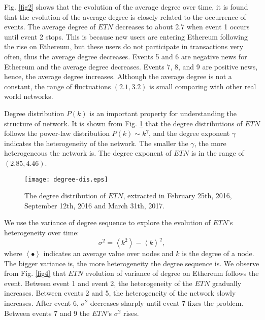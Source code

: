 \documentclass[conference]{IEEEtran}
\begin{document}
\begin{CJK*}{UTF8}{gbsn}
Fig. \ref{fig2} shows that the evolution of the average degree over time, it is found that the evolution of the average degree is closely related to the occurrence of events.
The average degree of $ETN$ decreases to about 2.7 when event 1 occurs until event 2 stops. This is because new users are entering Ethereum following the rise on Ethereum, but these users do not participate in transactions very often, thus the average degree decreases. Events 5 and 6 are negative news for Ethereum and the average degree decreases. Events 7, 8, and 9 are positive news, hence, the average degree increases. Although the average degree is not a constant, the range of fluctuations $(2.1,3.2)$ is small comparing with other real world networks.


Degree distribution $P(k)$ is an important property for understanding the structure of network\cite{barabasi2003scale}\cite{albert1999diameter}\cite{barabasi1999emergence}. It is shown from Fig. \ref{fig3} that the degree distributions of $ETN$ follows the power-law distribution $P(k)\sim k^\gamma$, and the degree exponent $\gamma$ indicates the heterogeneity of the network. The smaller the $\gamma$, the more heterogeneous the network is. The degree exponent of $ETN$ is in the range of $(2.85,4.46)$.


\begin{figure}[htbp]
\centering
\texttt{[image: degree-dis.eps]}
\caption{The degree distribution of $ETN$, extracted in February 25th, 2016, September 12th, 2016 and March 31th, 2017.}
\label{fig3}
\end{figure}

We use the variance of degree sequence to explore the evolution of $ETN$'s heterogeneity over time:
\begin{equation}
 \sigma^2=\left\langle k^2 \right\rangle-\left\langle k \right\rangle^2,
\end{equation}
where $ \left\langle \bullet \right\rangle $ indicates an average value over nodes and $k$ is the degree of a node. The bigger variance is, the more heterogeneity the degree sequence is. We observe from Fig. \ref{fig4}  that $ETN$ evolution of variance of degree on Ethereum follows the event. Between event 1 and event 2, the heterogeneity of the $ETN$ gradually increases. Between events 2 and 5, the heterogeneity of the network slowly increases. After event 6, $\sigma^2$ decreases sharply until event 7 fixes the problem. Between events 7 and 9 the $ETN$'s $\sigma^2$ rises.


\end{CJK*}
\end{document}
